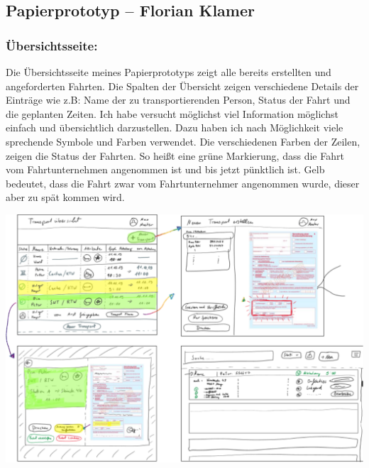 \documentclass[a4paper, ngerman, 12pt]{scrartcl}
\begin{document}
\subsection{Papierprototyp – Florian Klamer}
\subsubsection*{Übersichtsseite:}
Die Übersichtsseite meines Papierprototyps zeigt alle bereits erstellten und angeforderten Fahrten. Die Spalten der Übersicht zeigen verschiedene Details der Einträge wie z.B: Name der zu transportierenden Person, Status der Fahrt und die geplanten Zeiten. Ich habe versucht möglichst viel Information möglichst einfach und übersichtlich darzustellen. Dazu haben ich nach Möglichkeit viele sprechende Symbole und Farben verwendet. Die verschiedenen Farben der Zeilen, zeigen die Status der Fahrten. So heißt eine grüne Markierung, dass die Fahrt vom Fahrtunternehmen angenommen ist und bis jetzt pünktlich ist. Gelb bedeutet, dass die Fahrt zwar vom Fahrtunternehmer angenommen wurde, dieser aber zu spät kommen wird.\\
\begin{center}
\begin{minipage}[b]{0.7\textwidth}
	\centering
	\includegraphics[width=\textwidth]{Bilder/prototypFlo.pdf}
	\label{img:klamer}
\end{minipage}
\end{center}
\end{document}
